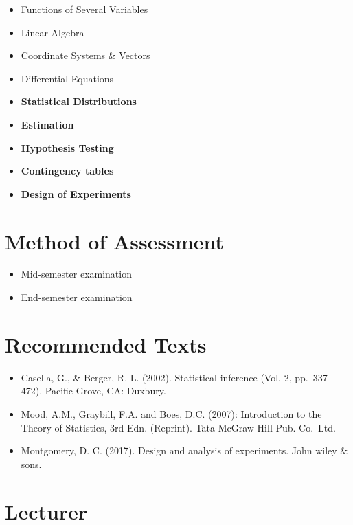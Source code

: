 \documentclass[]{book}
\providecommand{\tightlist}{%
  \setlength{\itemsep}{0pt}\setlength{\parskip}{0pt}}
\begin{document}
\begin{itemize}
\tightlist
\item
  Functions of Several Variables
\item
  Linear Algebra
\item
  Coordinate Systems \& Vectors
\item
  Differential Equations
\item
  \textbf{Statistical Distributions}
\item
  \textbf{Estimation}
\item
  \textbf{Hypothesis Testing}
\item
  \textbf{Contingency tables}
\item
  \textbf{Design of Experiments}
\end{itemize}

\hypertarget{method-of-assessment}{%
\section*{Method of Assessment}\label{method-of-assessment}}

\begin{itemize}
\tightlist
\item
  Mid-semester examination
\item
  End-semester examination
\end{itemize}

\hypertarget{recommended-texts}{%
\section*{Recommended Texts}\label{recommended-texts}}

\begin{itemize}
\tightlist
\item
  Casella, G., \& Berger, R. L. (2002). Statistical inference (Vol. 2, pp.~337-472). Pacific Grove, CA: Duxbury.
\item
  Mood, A.M., Graybill, F.A. and Boes, D.C. (2007): Introduction to the Theory of Statistics, 3rd Edn.
  (Reprint). Tata McGraw-Hill Pub. Co.~Ltd.~
\item
  Montgomery, D. C. (2017). Design and analysis of experiments. John wiley \& sons.
\end{itemize}

\hypertarget{lecturer}{%
\section*{Lecturer}\label{lecturer}}
\end{document}
